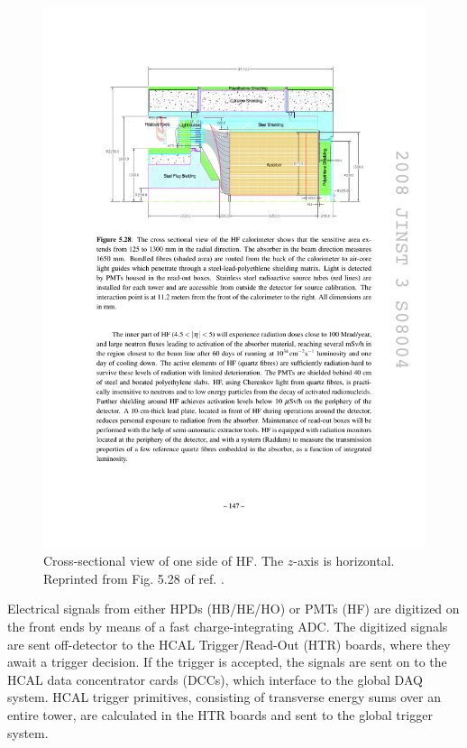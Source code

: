 \documentclass[dissertation.tex]{subfiles}
\begin{document}
\begin{figure}
	\centering
	\includegraphics[scale=1.0]{HCAL_HF_xsec}
	\caption{Cross-sectional view of one side of HF.  The $z$-axis is horizontal.  Reprinted from Fig. 5.28 of ref. \cite{CMS_detector_paper}.}
	\label{fig:HCAL_HF_xsec}
\end{figure}

Electrical signals from either HPDs (HB/HE/HO) or PMTs (HF) are digitized on the front ends by means of a fast charge-integrating ADC.  The digitized signals are sent off-detector to the HCAL Trigger/Read-Out (HTR) boards, where they await a trigger decision.  If the trigger is accepted, the signals are sent on to the HCAL data concentrator cards (DCCs), which interface to the global DAQ system.  HCAL trigger primitives, consisting of transverse energy sums over an entire tower, are calculated in the HTR boards and sent to the global trigger system.
\end{document}
